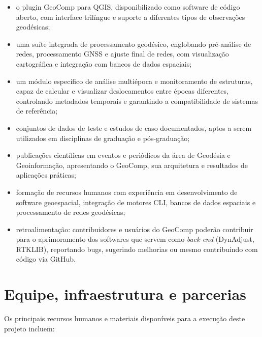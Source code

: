 \documentclass[
        12pt,                           %
        openright,                      %
        oneside,
        a4paper,                        %
        chapter=TITLE,         %
        section=TITLE,         %
        subsection=Title,      %
        english,                        %
        portugues,                      %
        ]{abntex2}
\begin{document}
\begin{itemize}
    \item o plugin GeoComp para QGIS, disponibilizado como software de código aberto, com interface trilíngue e suporte a diferentes tipos de observações geodésicas;
    \item uma suíte integrada de processamento geodésico, englobando pré-análise de redes, processamento GNSS e ajuste final de redes, com visualização cartográfica e integração com bancos de dados espaciais;
    \item um módulo específico de análise multiépoca e monitoramento de estruturas, capaz de calcular e visualizar deslocamentos entre épocas diferentes, controlando metadados temporais e garantindo a compatibilidade de sistemas de referência;
    \item conjuntos de dados de teste e estudos de caso documentados, aptos a serem utilizados em disciplinas de graduação e pós-graduação;
    \item publicações científicas em eventos e periódicos da área de Geodésia e Geoinformação, apresentando o GeoComp, sua arquitetura e resultados de aplicações práticas;
    \item formação de recursos humanos com experiência em desenvolvimento de software geoespacial, integração de motores CLI, bancos de dados espaciais e processamento de redes geodésicas;
    \item retroalimentação: contribuidores e usuários do GeoComp poderão contribuir para o aprimoramento dos softwares que servem como \textit{back-end} (DynAdjust, RTKLIB), reportando bugs, sugerindo melhorias ou mesmo contribuindo com código via GitHub.
\end{itemize}

\chapter{Equipe, infraestrutura e parcerias}
\label{ch:equipe}


Os principais recursos humanos e materiais disponíveis para a execução deste projeto incluem:
\end{document}
